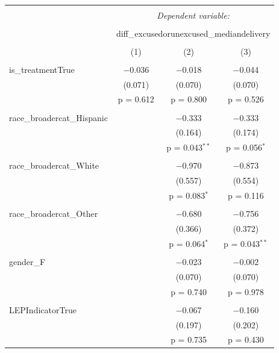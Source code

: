
\begin{table}[!htbp] \centering 
  \caption{} 
  \label{} 
\begin{tabular}{@{\extracolsep{5pt}}lccc} 
\\[-1.8ex]\hline 
\hline \\[-1.8ex] 
 & \multicolumn{3}{c}{\textit{Dependent variable:}} \\ 
\cline{2-4} 
\\[-1.8ex] & \multicolumn{3}{c}{diff\_excusedorunexcused\_mediandelivery} \\ 
\\[-1.8ex] & (1) & (2) & (3)\\ 
\hline \\[-1.8ex] 
 is\_treatmentTrue & $-$0.036 & $-$0.018 & $-$0.044 \\ 
  & (0.071) & (0.070) & (0.070) \\ 
  & p = 0.612 & p = 0.800 & p = 0.526 \\ 
  & & & \\ 
 race\_broadercat\_Hispanic &  & $-$0.333 & $-$0.333 \\ 
  &  & (0.164) & (0.174) \\ 
  &  & p = 0.043$^{**}$ & p = 0.056$^{*}$ \\ 
  & & & \\ 
 race\_broadercat\_White &  & $-$0.970 & $-$0.873 \\ 
  &  & (0.557) & (0.554) \\ 
  &  & p = 0.083$^{*}$ & p = 0.116 \\ 
  & & & \\ 
 race\_broadercat\_Other &  & $-$0.680 & $-$0.756 \\ 
  &  & (0.366) & (0.372) \\ 
  &  & p = 0.064$^{*}$ & p = 0.043$^{**}$ \\ 
  & & & \\ 
 gender\_F &  & $-$0.023 & $-$0.002 \\ 
  &  & (0.070) & (0.070) \\ 
  &  & p = 0.740 & p = 0.978 \\ 
  & & & \\ 
 LEPIndicatorTrue &  & $-$0.067 & $-$0.160 \\ 
  &  & (0.197) & (0.202) \\ 
  &  & p = 0.735 & p = 0.430 \\ 

\end{tabular}
\end{table}
